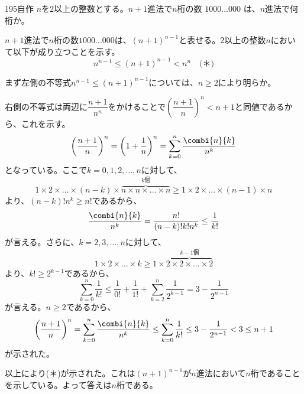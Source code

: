 \begin{prob}{195}{\maru}{自作}
 $n$を2以上の整数とする。$n+1$進法で$n$桁の数 $1000\dots000$ は、$n$進法で何桁か。
\end{prob}
$n+1$進法で$n$桁の数$1000\dots000$は、$(n+1)^{n-1}$と表せる。2以上の整数$n$において以下が成り立つことを示す。
\[ n^{n-1}\le (n+1)^{n-1} < n^n \quad \text{(＊)} \]

まず左側の不等式$n^{n-1}\le (n+1)^{n-1}$については、$n\ge 2$により明らか。

右側の不等式は両辺に$\dfrac{n+1}{n^n}$をかけることで$\left(\dfrac{n+1}{n}\right)^n<n+1$と同値であるから、これを示す。
\[ \left(\frac{n+1}{n}\right)^n = \left(1+\frac{1}{n}\right)^n=\sum_{k=0}^n\frac{\combi{n}{k}}{n^k} \]
となっている。ここで$k=0, 1, 2,\dots, n$に対して、
\[ 1\times 2\times\dots\times(n-k)\times\overbrace{n\times n\times\dots\times n}^{k\text{個}} \ge 1\times 2\times \dots\times (n-1)\times n \]
より、$(n-k)!n^k\ge n!$であるから、
\[ \frac{\combi{n}{k}}{n^k}=\frac{n!}{(n-k)! k! n^k} \le \frac{1}{k!} \]
が言える。さらに、$k=2, 3, \dots, n$に対して、
\[ 1\times 2\times \dots \times k \ge 1\times \overbrace{2\times 2\times \dots \times 2}^{k-1\text{個}} \]
より、$k!\ge 2^{k-1}$であるから、
\[ \sum_{k=0}^n \frac{1}{k!} \le \frac{1}{0!}+\frac{1}{1!}+\sum_{k=2}^n \frac{1}{2^{k-1}} = 3-\frac{1}{2^{n-1}} \]
が言える。$n\ge 2$であるから、
\[ \left(\frac{n+1}{n}\right)^n=\sum_{k=0}^n \frac{\combi{n}{k}}{n^k} \le \sum_{k=0}^n \frac{1}{k!}\le 3-\frac{1}{2^{n-1}}< 3\le n+1 \]
が示された。

以上により(＊)が示された。これは$(n+1)^{n-1}$が$n$進法において$n$桁であることを示している。よって答えは$n$桁である。